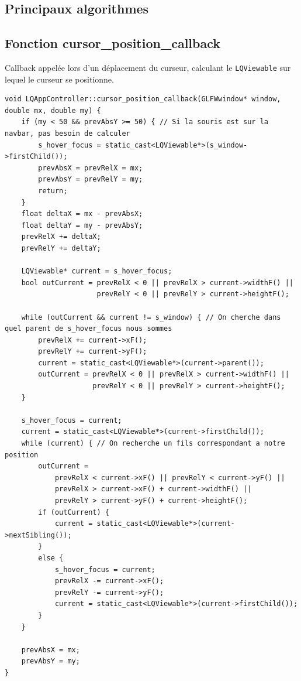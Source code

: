 \documentclass{report}
\begin{document}
\begin{appendix}
\chapter{Principaux algorithmes}
\section{Fonction cursor\_position\_callback}
Callback appelée lors d'un déplacement du curseur, calculant le \verb!LQViewable! sur lequel le curseur se positionne.
\begin{lstlisting}[style=cpp, caption=LQAppController::cursor\_position\_callback, label=cpc]
void LQAppController::cursor_position_callback(GLFWwindow* window, double mx, double my) {
    if (my < 50 && prevAbsY >= 50) { // Si la souris est sur la navbar, pas besoin de calculer
        s_hover_focus = static_cast<LQViewable*>(s_window->firstChild());
        prevAbsX = prevRelX = mx;
        prevAbsY = prevRelY = my;
        return;
    }
    float deltaX = mx - prevAbsX;
    float deltaY = my - prevAbsY;
    prevRelX += deltaX;
    prevRelY += deltaY;

    LQViewable* current = s_hover_focus;
    bool outCurrent = prevRelX < 0 || prevRelX > current->widthF() ||
                      prevRelY < 0 || prevRelY > current->heightF();

    while (outCurrent && current != s_window) { // On cherche dans quel parent de s_hover_focus nous sommes
        prevRelX += current->xF();
        prevRelY += current->yF();
        current = static_cast<LQViewable*>(current->parent());
        outCurrent = prevRelX < 0 || prevRelX > current->widthF() ||
                     prevRelY < 0 || prevRelY > current->heightF();
    }

    s_hover_focus = current;
    current = static_cast<LQViewable*>(current->firstChild());
    while (current) { // On recherche un fils correspondant a notre position
        outCurrent =
            prevRelX < current->xF() || prevRelY < current->yF() ||
            prevRelX > current->xF() + current->widthF() ||
            prevRelY > current->yF() + current->heightF();
        if (outCurrent) {
            current = static_cast<LQViewable*>(current->nextSibling());
        }
        else {
            s_hover_focus = current;
            prevRelX -= current->xF();
            prevRelY -= current->yF();
            current = static_cast<LQViewable*>(current->firstChild());
        }
    }

    prevAbsX = mx;
    prevAbsY = my;
}
\end{lstlisting}


\end{appendix}
\end{document}
